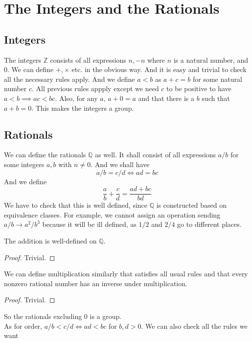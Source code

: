 \section{The Integers and the Rationals}
\subsection{Integers}
The integers $\mathbb Z$ consists of all expressions $n,-n$ where $n$ is a natural number, and $0$.
We can define $+, \times$ etc. in the obvious way.
And it is easy and trivial to check all the necessary rules apply.
And we define $a<b$ as $a+c=b$ for some natural number $c$.
All previous rules appply except we need $c$ to be positive to have $a<b\implies ac<bc$.
Also, for any $a$, $a+0=a$ and that there is a $b$ such that $a+b=0$.
This makes the integers a group.
\subsection{Rationals}
We can define the rationals $\mathbb Q$ as well.
It shall consist of all expressions $a/b$ for some integers $a,b$ with $n\neq 0$.
And we shall have 
$$a/b=c/d\iff ad=bc$$
And we define 
$$\frac{a}{b}+\frac{c}{d}=\frac{ad+bc}{bd}$$
We have to check that this is well defined, since $\mathbb Q$ is constructed based on equivalence classes.
For example, we cannot assign an operation sending $a/b\to a^2/b^3$ because it will be ill defined, as $1/2$ and $2/4$ go to different places.
\begin{proposition}
    The addition is well-defined on $\mathbb Q$.
\end{proposition}
\begin{proof}
    Trivial.
\end{proof}
\begin{proposition}
    We can define multiplication similarly that satisfies all usual rules and that every nonzero rational number has an inverse under multiplication.
\end{proposition}
\begin{proof}
    Trivial.
\end{proof}
So the rationals excluding $0$ is a group.\\
As for order, $a/b<c/d\iff ad<bc$ for $b,d>0$.
We can also check all the rules we want
